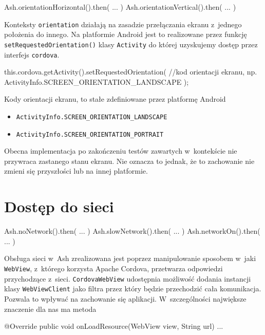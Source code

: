 \documentclass[brudnopis]{xmgr}
\begin{document}
\begin{javascriptcode}
  Ash.orientationHorizontal().then( ... )   
  Ash.orientationVertical().then( ... ) 
\end{javascriptcode}

Konteksty \texttt{orientation} działają na zasadzie przełączania ekranu z~jednego położenia do innego. Na platformie Android jest to realizowane przez funkcję \texttt{setRequestedOrientation()} klasy \texttt{Activity} do której uzyskujemy dostęp przez interfejs \texttt{cordova}. 

\begin{javacode}
this.cordova.getActivity().setRequestedOrientation(
  //kod orientacji ekranu, np. 
  ActivityInfo.SCREEN_ORIENTATION_LANDSCAPE
);
\end{javacode}

Kody orientacji ekranu, to stałe zdefiniowane przez platformę Android
\begin{itemize}
  \item \texttt{ActivityInfo.SCREEN\_ORIENTATION\_LANDSCAPE}
  \item \texttt{ActivityInfo.SCREEN\_ORIENTATION\_PORTRAIT}
\end{itemize}

Obecna implementacja po zakończeniu testów zawartych w~kontekście nie przywraca zastanego stanu ekranu. Nie oznacza to jednak, że to zachowanie nie zmieni się przyszłości lub na innej platformie.

\section{Dostęp do sieci}

\begin{javascriptcode}
Ash.noNetwork().then( ... ) 
Ash.slowNetwork().then( ... ) 
Ash.networkOn().then( ... ) 
\end{javascriptcode}

Obsługa sieci w~Ash zrealizowana jest poprzez manipulowanie sposobem w~jaki \texttt{WebView}, z~którego korzysta Apache Cordova, przetwarza odpowiedzi przychodzące z~sieci. \texttt{CordovaWebView} udostępnia możliwość dodania instancji klasy \texttt{WebViewClient} jako filtra przez który będzie przechodzić cała komunikacja. Pozwala to wpływać na zachowanie się aplikacji. W~szczególności największe znaczenie dla nas ma metoda

\begin{javacode}
   @Override
   public void onLoadResource(WebView view, String url) {
       ...
   }
\end{javacode}
\end{document}
